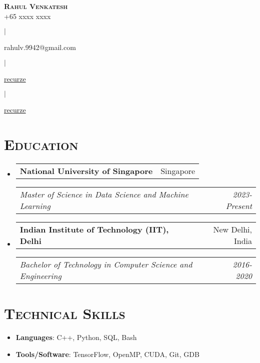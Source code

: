 \documentclass{article}
\makeatletter
\newcommand{\headerrow}[2]
{\begin{tabular*}{\linewidth}{l@{\extracolsep{\fill}}r}
    #1 &
    #2 \\
\end{tabular*}}
\newcommand{\email}[1]{
    \faEnvelope \space #1
}
\newcommand{\phone}[1]{
    \faPhone \space #1
}
\newcommand{\github}[1]{
    \href{https://www.github.com/#1}{\faGithub \space #1}
}
\newcommand{\linkedin}[1]{
    \href{https://www.linkedin.com/in/#1}{\faLinkedin \space #1}
}
\makeatother
\begin{document}
\begin{center}
    {\huge \textsc{\textbf{Rahul Venkatesh}}} \\[2pt]
    \phone{+65 xxxx xxxx}
    $\mid$
    \email{rahulv.9942@gmail.com}
    $\mid$
    \linkedin{recurze}
    $\mid$
    \github{recurze}
\end{center}

\section*{\textsc{Education}}
\begin{itemize}[leftmargin=0em]

\item[]
    \headerrow {\textbf{National University of Singapore}}{Singapore}
    \headerrow {\emph{Master of Science in Data Science and Machine Learning}}{\emph{2023-Present}}

\item[]
    \headerrow {\textbf{Indian Institute of Technology (IIT), Delhi}}{New Delhi, India}
    \headerrow {\emph{Bachelor of Technology in Computer Science and Engineering}}{\emph{2016-2020}}

\end{itemize}

%

\section*{\textsc{Technical Skills}}
\begin{itemize}[itemsep=0em, leftmargin=0.7em]
\item[]
    \textbf{Languages}: C++, Python, SQL, Bash
\item[]
    \textbf{Tools/Software}: TensorFlow, OpenMP, CUDA, Git, GDB
\end{itemize}
\end{document}
